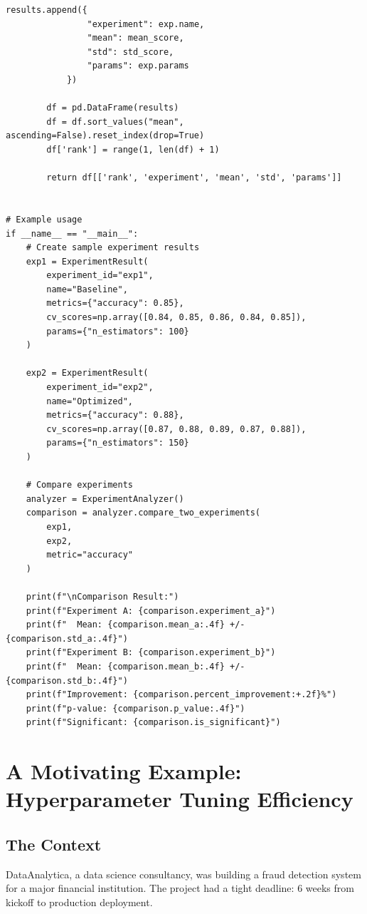 \begin{lstlisting}[style=python, caption={Statistical experiment comparison framework}]
            results.append({
                "experiment": exp.name,
                "mean": mean_score,
                "std": std_score,
                "params": exp.params
            })

        df = pd.DataFrame(results)
        df = df.sort_values("mean", ascending=False).reset_index(drop=True)
        df['rank'] = range(1, len(df) + 1)

        return df[['rank', 'experiment', 'mean', 'std', 'params']]


# Example usage
if __name__ == "__main__":
    # Create sample experiment results
    exp1 = ExperimentResult(
        experiment_id="exp1",
        name="Baseline",
        metrics={"accuracy": 0.85},
        cv_scores=np.array([0.84, 0.85, 0.86, 0.84, 0.85]),
        params={"n_estimators": 100}
    )

    exp2 = ExperimentResult(
        experiment_id="exp2",
        name="Optimized",
        metrics={"accuracy": 0.88},
        cv_scores=np.array([0.87, 0.88, 0.89, 0.87, 0.88]),
        params={"n_estimators": 150}
    )

    # Compare experiments
    analyzer = ExperimentAnalyzer()
    comparison = analyzer.compare_two_experiments(
        exp1,
        exp2,
        metric="accuracy"
    )

    print(f"\nComparison Result:")
    print(f"Experiment A: {comparison.experiment_a}")
    print(f"  Mean: {comparison.mean_a:.4f} +/- {comparison.std_a:.4f}")
    print(f"Experiment B: {comparison.experiment_b}")
    print(f"  Mean: {comparison.mean_b:.4f} +/- {comparison.std_b:.4f}")
    print(f"Improvement: {comparison.percent_improvement:+.2f}%")
    print(f"p-value: {comparison.p_value:.4f}")
    print(f"Significant: {comparison.is_significant}")
\end{lstlisting}

\section{A Motivating Example: Hyperparameter Tuning Efficiency}

\subsection{The Context}

DataAnalytica, a data science consultancy, was building a fraud detection system for a major financial institution. The project had a tight deadline: 6 weeks from kickoff to production deployment.

